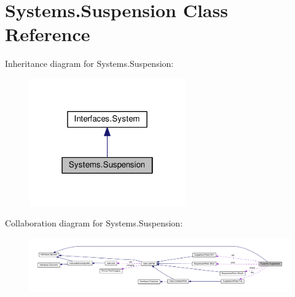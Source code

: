 \hypertarget{classSystems_1_1Suspension}{}\section{Systems.\+Suspension Class Reference}
\label{classSystems_1_1Suspension}


Inheritance diagram for Systems.\+Suspension\+:\nopagebreak
\begin{figure}[H]
\begin{center}
\leavevmode
\includegraphics[width=190pt]{classSystems_1_1Suspension__inherit__graph}
\end{center}
\end{figure}


Collaboration diagram for Systems.\+Suspension\+:
\nopagebreak
\begin{figure}[H]
\begin{center}
\leavevmode
\includegraphics[width=350pt]{classSystems_1_1Suspension__coll__graph}
\end{center}
\end{figure}
